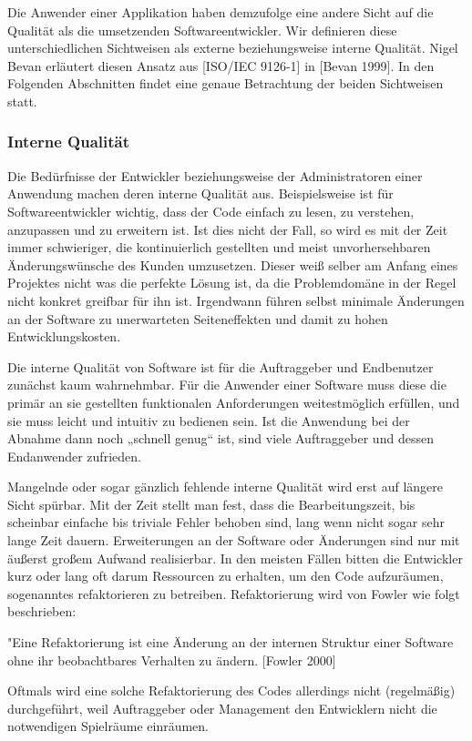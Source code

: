 Die Anwender einer Applikation haben demzufolge eine andere Sicht auf die Qualität als die umsetzenden Softwareentwickler. Wir definieren diese unterschiedlichen Sichtweisen als externe beziehungsweise interne Qualität. Nigel Bevan erläutert diesen Ansatz aus [ISO/IEC 9126-1] in [Bevan 1999]. In den Folgenden Abschnitten findet eine genaue Betrachtung der beiden Sichtweisen statt.

\subsubsection{Interne Qualität}
Die Bedürfnisse der Entwickler beziehungsweise der Administratoren einer Anwendung machen deren interne Qualität aus. Beispielsweise ist für Softwareentwickler wichtig, dass der Code einfach zu lesen, zu verstehen, anzupassen und zu erweitern ist. Ist dies nicht der Fall, so wird es mit der Zeit immer schwieriger, die kontinuierlich gestellten und meist unvorhersehbaren Änderungswünsche des Kunden umzusetzen. Dieser weiß selber am Anfang eines Projektes nicht was die perfekte Lösung ist, da die Problemdomäne in der Regel nicht konkret greifbar für ihn ist. Irgendwann führen selbst minimale Änderungen an der Software zu unerwarteten Seiteneffekten und damit zu hohen Entwicklungskosten.

Die interne Qualität von Software ist für die Auftraggeber und Endbenutzer zunächst kaum wahrnehmbar. Für die Anwender einer Software muss diese die primär an sie gestellten funktionalen Anforderungen weitestmöglich erfüllen, und sie muss leicht und intuitiv zu bedienen sein. Ist die Anwendung bei der Abnahme dann noch „schnell genug“ ist, sind viele Auftraggeber und dessen Endanwender zufrieden.

Mangelnde oder sogar gänzlich fehlende interne Qualität wird erst auf längere Sicht spürbar. Mit der Zeit stellt man fest, dass die Bearbeitungszeit, bis scheinbar einfache bis triviale Fehler behoben sind, lang wenn nicht sogar sehr lange Zeit dauern. Erweiterungen an der Software oder Änderungen sind nur mit äußerst großem Aufwand realisierbar. In den meisten Fällen bitten die Entwickler kurz oder lang oft darum Ressourcen zu erhalten, um den Code aufzuräumen, sogenanntes refaktorieren zu betreiben. Refaktorierung wird von Fowler wie folgt beschrieben: 

"Eine Refaktorierung ist eine Änderung an der internen Struktur einer Software ohne ihr beobachtbares Verhalten zu ändern. [Fowler 2000]

Oftmals wird eine solche Refaktorierung des Codes allerdings nicht (regelmäßig) durchgeführt, weil Auftraggeber oder Management den Entwicklern nicht die notwendigen Spielräume einräumen.

